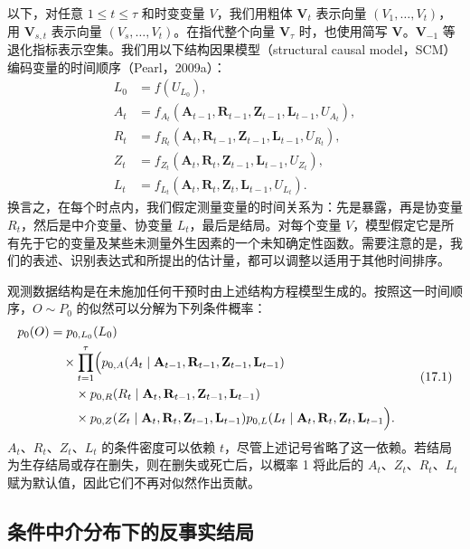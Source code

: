 以下，对任意 $1\leq t\leq\tau$ 和时变变量 $V$，我们用粗体 $\mathbf V_t$ 表示向量 $(V_1,\ldots,V_t)$，用 $\mathbf V_{s,t}$ 表示向量 $(V_s,\ldots,V_t)$。在指代整个向量 $\mathbf V_\tau$ 时，也使用简写 $\mathbf V$。$\mathbf V_{-1}$ 等退化指标表示空集。我们用以下结构因果模型（structural causal model，SCM）编码变量的时间顺序（Pearl，2009a）：
\[
\begin{aligned}
 L_0&=f(U_{L_0}),\\
 A_t&=f_{A_t}(\mathbf A_{t-1},\mathbf R_{t-1},\mathbf Z_{t-1},\mathbf L_{t-1},U_{A_t}),\\
 R_t&=f_{R_t}(\mathbf A_t,\mathbf R_{t-1},\mathbf Z_{t-1},\mathbf L_{t-1},U_{R_t}),\\
 Z_t&=f_{Z_t}(\mathbf A_t,\mathbf R_t,\mathbf Z_{t-1},\mathbf L_{t-1},U_{Z_t}),\\
 L_t&=f_{L_t}(\mathbf A_t,\mathbf R_t,\mathbf Z_t,\mathbf L_{t-1},U_{L_t}).
\end{aligned}
\]
换言之，在每个时点内，我们假定测量变量的时间关系为：先是暴露，再是协变量 $R_t$，然后是中介变量、协变量 $L_t$，最后是结局。对每个变量 $V$，模型假定它是所有先于它的变量及某些未测量外生因素的一个未知确定性函数。需要注意的是，我们的表述、识别表达式和所提出的估计量，都可以调整以适用于其他时间排序。

观测数据结构是在未施加任何干预时由上述结构方程模型生成的。按照这一时间顺序，$O\sim P_0$ 的似然可以分解为下列条件概率：
\begin{equation}
\begin{aligned}
 p_0(O)&=p_{0,L_0}(L_0)\\
 &\quad{}\times\prod_{t=1}^\tau\Bigl(
 p_{0,A}(A_t\mid\mathbf A_{t-1},\mathbf R_{t-1},\mathbf Z_{t-1},\mathbf L_{t-1})\\
 &\qquad{}\times p_{0,R}(R_t\mid\mathbf A_t,\mathbf R_{t-1},\mathbf Z_{t-1},\mathbf L_{t-1})\\
 &\qquad{}\times p_{0,Z}(Z_t\mid\mathbf A_t,\mathbf R_t,\mathbf Z_{t-1},\mathbf L_{t-1})
 p_{0,L}(L_t\mid\mathbf A_t,\mathbf R_t,\mathbf Z_t,\mathbf L_{t-1}\Bigr).
\end{aligned}
\tag{17.1}
\end{equation}
$A_t$、$R_t$、$Z_t$、$L_t$ 的条件密度可以依赖 $t$，尽管上述记号省略了这一依赖。若结局为生存结局或存在删失，则在删失或死亡后，以概率 1 将此后的 $A_t$、$Z_t$、$R_t$、$L_t$ 赋为默认值，因此它们不再对似然作出贡献。

\subsection{条件中介分布下的反事实结局}

